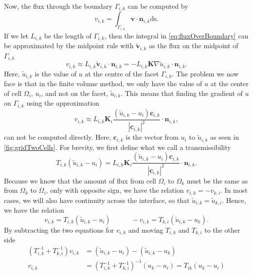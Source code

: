  Now, the flux through the boundary $\Gamma_{i,k}$ can be computed by
\begin{equation}
    v_{i,k} = \int_{\Gamma_{i,k}} \textbf{v}\cdot\textbf{n}_{i,k} \mbox{ds}. 
    \label{eq:fluxOverBoundary}
\end{equation}
If we let $L_{i,k}$ be the length of $\Gamma_{i,k}$, then the integral in \eqref{eq:fluxOverBoundary} can be approximated by the midpoint rule with $\tilde{\textbf{v}}_{i,k}$ as the flux on the midpoint of $\Gamma_{i,k}$ 
\begin{equation*}
    v_{i,k} \approx L_{i,k}\tilde{\textbf{v}}_{i,k} \cdot \textbf{n}_{i,k} = -L_{i,k}\textbf{K}\nabla \tilde{u}_{i,k} \cdot \textbf{n}_{i,k}.
\end{equation*}
Here, $\tilde{u}_{i,k}$ is the value of $u$ at the centre of the facet $\Gamma_{i,k}$. The problem we now face is that in the finite volume method, we only have the value of $u$ at the center of cell $\Omega_i$, $u_i$, and not on the facet, $\tilde{u}_{i,k}$. This means that finding the gradient of $u$ on $\Gamma_{i,k}$ using the approximation
\begin{equation*}
    v_{i,k} \approx L_{i,k}\textbf{K}_i\frac{(\tilde{u}_{i,k} - u_i)\textbf{c}_{i,k}}{|\textbf{c}_{i,k}|^2} \cdot \textbf{n}_{i,k},
\end{equation*}
can not be computed directly. Here, $\textbf{c}_{i,k}$ is the vector from $u_i$ to $\tilde{u}_{i,k}$ as seen in \autoref{fig:gridTwoCells}.  For brevity, we first define what we call a transmissibility
\begin{equation}
    T_{i,k}(\tilde{u}_{i,k} - u_i) = L_{i,k}\textbf{K}_i\frac{(\tilde{u}_{i,k} - u_i)\textbf{c}_{i,k}}{|\textbf{c}_{i,k}|^2} \cdot \textbf{n}_{i,k}.
    \label{eq:transmissibility}
\end{equation}
Because we know that the amount of flux from cell $\Omega_i$ to $\Omega_k$ must be the same as from $\Omega_k$ to $\Omega_i$, only with opposite sign, we have the relation $v_{i,k} = -v_{k,i}$.  In most cases, we will also have continuity across the interface, so that $\tilde{u}_{i,k} = \tilde{u}_{k,i}$. Hence, we have the relation 
\begin{equation*}
    v_{i,k} = T_{i,k}(\tilde{u}_{i,k} - u_i) \hspace{3em} -v_{i,k} = T_{k,i}(\tilde{u}_{i,k} - u_k).
\end{equation*}
By subtracting the two equations for $v_{i,k}$ and moving $T_{i,k}$ and $T_{k,i}$ to the other side 
\begin{equation}
    \begin{aligned}
        (T_{i,k}^{-1} + T_{k,i}^{-1}) v_{i,k} &= (\tilde{u}_{i,k} - u_i) - (\tilde{u}_{i,k} - u_k)
        \\
        v_{i,k} &= (T_{i,k}^{-1} + T_{k,i}^{-1})^{-1}(u_k - u_i) = T_{ik}(u_k - u_i)
    \end{aligned}
    \label{eq:flux}
\end{equation}
